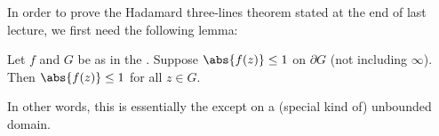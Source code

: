 


In order to prove the Hadamard three-lines theorem stated at the end of last lecture, we first need the following lemma:

\begin{lemma}\label{lem6.7}
	Let $f$ and $G$ be as in the .
	Suppose $\abs{f(z)} \leq 1$ on $\partial G$ (not including $\infty$).
	Then $\abs{f(z)} \leq 1$ for all $z \in G$.
\end{lemma}

In other words, this is essentially the  except on a (special kind of) unbounded domain.

